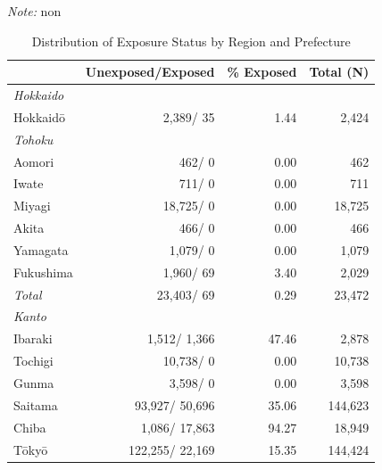 \documentclass[
  letterpaper,
  DIV=11,
  numbers=noendperiod]{scrartcl}
\begin{document}
\emph{Note:} non

\begin{table}[htbp]\centering
\caption{Distribution of Exposure Status by Region and Prefecture}
\label{tab:exposure_region}
\footnotesize
\setlength{\tabcolsep}{4pt}
\renewcommand{\arraystretch}{0.82}
\begin{tabular}{lrrr}
\toprule
 & Unexposed/Exposed & \% Exposed & Total (N) \\
\midrule
\textit{Hokkaido} & & & \\
\hspace{1em}Hokkaidō    & 2,389/ 35     & 1.44  & 2,424   \\
\addlinespace
\textit{Tohoku} & & & \\
\hspace{1em}Aomori      & 462/ 0        & 0.00  & 462     \\
\hspace{1em}Iwate       & 711/ 0        & 0.00  & 711     \\
\hspace{1em}Miyagi      & 18,725/ 0     & 0.00  & 18,725  \\
\hspace{1em}Akita       & 466/ 0        & 0.00  & 466     \\
\hspace{1em}Yamagata    & 1,079/ 0      & 0.00  & 1,079   \\
\hspace{1em}Fukushima   & 1,960/ 69     & 3.40  & 2,029   \\
\hspace{1em}\textit{Total}       & 23,403/ 69    & 0.29  & 23,472  \\
\addlinespace
\textit{Kanto} & & & \\
\hspace{1em}Ibaraki     & 1,512/ 1,366  & 47.46 & 2,878   \\
\hspace{1em}Tochigi     & 10,738/ 0     & 0.00  & 10,738  \\
\hspace{1em}Gunma       & 3,598/ 0      & 0.00  & 3,598   \\
\hspace{1em}Saitama     & 93,927/ 50,696& 35.06 & 144,623 \\
\hspace{1em}Chiba       & 1,086/ 17,863 & 94.27 & 18,949  \\
\hspace{1em}Tōkyō       & 122,255/ 22,169& 15.35& 144,424 \\

\end{tabular}
\end{table}
\end{document}
